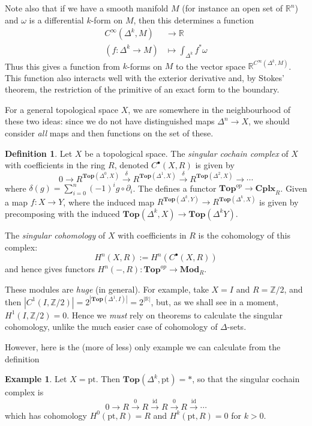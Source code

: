 \documentclass{tufte-handout}
\def\pt {\mathrm{pt}}
\def\Top {\mathbf{Top}}
\def\Mod {\mathbf{Mod}}
\def\Cplx{\mathbf{Cplx}}
\def\RR{\mathbb{R}}
\def\ZZ{\mathbb{Z}}
\DeclareMathOperator{\id}{id}
\theoremstyle{definition}
\newtheorem{definition}{Definition}
\newtheorem{example}{Example}
\begin{document}
Note also that if we have a smooth manifold $M$ (for instance an open set of $\RR^n$) and $\omega$ is
a differential $k$-form on $M$, then this determines a function
\begin{align*}
C^\infty(\Delta^k,M) &\to \RR\\
(f\colon \Delta^k\to M) & \mapsto \int_{\Delta^k} f^*\omega
\end{align*}
Thus this gives a function from $k$-forms on $M$ to the vector space $\RR^{C^\infty(\Delta^k,M)}$. 
This function also interacts well with the exterior derivative and, by Stokes' theorem, the restriction
of the primitive of an exact form to the boundary.

For a general topological space $X$, we are somewhere in the neighbourhood of these two ideas: since we do 
not have distinguished maps $\Delta^n \to X$, we should consider \emph{all} maps and then functions on
the set of these.

\begin{definition}
Let $X$ be a topological space. The \emph{singular cochain complex} of $X$ with coefficients in the 
ring $R$, denoted $C^\bullet(X,R)$  is given by
\[
	0 \to R^{\Top(\Delta^0,X)} \xrightarrow{\delta} R^{\Top(\Delta^1,X)} \xrightarrow{\delta} R^{\Top(\Delta^2,X)}\to \cdots
\]
where $\delta(g) = \sum_{i=0}^n (-1)^i g\circ \partial_i$. The defines a functor $\Top^{op} \to \Cplx_R$.
Given a map $f\colon X\to Y$, where the induced map $R^{\Top(\Delta^k,Y)} \to R^{\Top(\Delta^k,X)}$ is given by precomposing with the induced $\Top(\Delta^k,X) \to \Top(\Delta^kY)$.

The \emph{singular cohomology} of $X$ with coefficients in $R$ is the cohomology of this complex:
\[
	H^n(X,R) := H^n(C^\bullet(X,R))
\]
and hence gives functors $H^n(-,R) \colon \Top^{op} \to \Mod_R$.
\end{definition}

These modules are \emph{huge} (in general). For example, take $X=I$ and $R=\ZZ/2$, and then 
$|C^1(I,\ZZ/2)| = 2^{|\Top(\Delta^1,I)|} = 2^{|\RR|}$, but, as we shall see in a moment, $H^1(I,\ZZ/2)=0$. 
Hence we \emph{must} rely on theorems to calculate the singular cohomology, unlike the much easier case
of cohomology of $\Delta$-sets.

However, here is the (more of less) only example we can calculate from the definition
\begin{example}
Let $X=\pt$. Then $\Top(\Delta^k,\pt) = \ast$, so that the singular cochain complex 
is
\[
0 \to R \xrightarrow{0} R \xrightarrow{\id} R \xrightarrow{0} R\xrightarrow{\id} \cdots
\]
which has cohomology $H^0(\pt,R) = R$ and $H^k(\pt,R) = 0$ for $k>0$.
\end{example}
\end{document}
